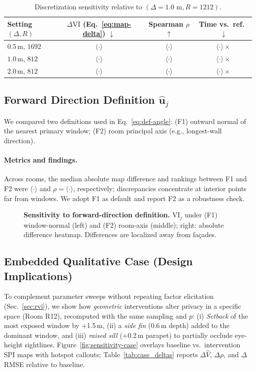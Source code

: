 \documentclass[final,3p,times,review]{elsarticle}
\begin{document}
\begin{table}[H]
\centering
\caption{Discretization sensitivity relative to $(\Delta{=}1.0\text{ m}, R{=}1212)$.}
\label{tab:discretization}
\begin{tabular}{@{}lccc@{}}
\toprule
Setting $(\Delta,R)$ & $\Delta \mathrm{VI}$ (Eq.~\ref{eq:map-delta}) $\downarrow$ & Spearman $\rho$ $\uparrow$ & Time vs.\ ref.\ $\downarrow$ \\
\midrule
$0.5$\,m, $1692$ & $\langle\cdot\rangle$ & $\langle\cdot\rangle$ & $\langle\cdot\rangle\times$ \\
$1.0$\,m, $812$  & $\langle\cdot\rangle$ & $\langle\cdot\rangle$ & $\langle\cdot\rangle\times$ \\
$2.0$\,m, $812$  & $\langle\cdot\rangle$ & $\langle\cdot\rangle$ & $\langle\cdot\rangle\times$ \\
\bottomrule
\end{tabular}
\end{table}

\subsection{Forward Direction Definition $\hat{\mathbf{u}}_j$}
We compared two definitions used in Eq.~\eqref{eq:def-angle}: (F1) outward normal of the nearest primary window; (F2) room principal axis (e.g., longest-wall direction).

\paragraph{Metrics and findings.}
Across rooms, the median absolute map difference and rankings between F1 and F2 were $\langle\cdot\rangle$ and $\rho{=}\langle\cdot\rangle$, respectively; discrepancies concentrate at interior points far from windows. We adopt F1 as default and report F2 as a robustness check.

\begin{figure}[H]
\centering
\caption{\textbf{Sensitivity to forward-direction definition.} $\mathrm{VI}_j$ under (F1) window-normal (left) and (F2) room-axis (middle); right: absolute difference heatmap. Differences are localized away from façades.}
\label{fig:forward-sensitivity}
\end{figure}

\subsection{Embedded Qualitative Case (Design Implications)}
To complement parameter sweeps without repeating factor elicitation (Sec.~\ref{sec:rvi}), we show how \emph{geometric} interventions alter privacy in a specific space (Room R12), recomputed with the same sampling and $p$:
(i) \emph{Setback} of the most exposed window by +1.5\,m,
(ii) a \emph{side fin} (0.6\,m depth) added to the dominant window, and
(iii) \emph{raised sill} (+0.2\,m parapet) to partially occlude eye-height sightlines.
Figure~\ref{fig:sensitivity-case} overlays baseline vs.\ intervention SPI maps with hotspot callouts; Table~\ref{tab:case_deltas} reports $\Delta\widehat{V}$, $\Delta\rho$, and $\Delta$RMSE relative to baseline.
\end{document}
